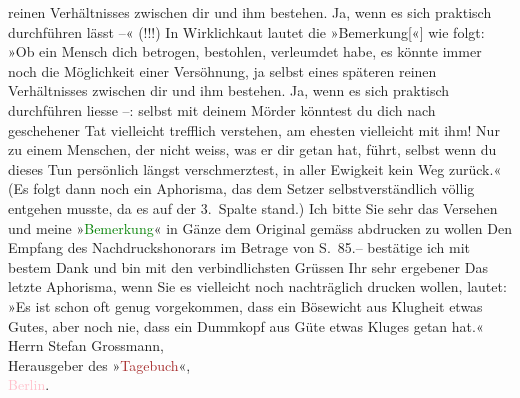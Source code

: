                     reinen Verhältnisses zwischen dir und ihm bestehen. Ja, wenn es sich praktisch
                    durchführen lässt –« (!!!)\pend
           \pstart
           In Wirklichkaut lautet die »Bemerkung{[}«{]} wie folgt:\pend
           \pstart
           »Ob ein Mensch dich betrogen, bestohlen, 
                    verleumdet habe, es könnte immer noch die Möglichkeit einer Versöhnung, ja
                    selbst eines späteren reinen Verhältnisses zwischen dir und ihm bestehen. Ja,
                    wenn es sich praktisch durchführen liesse –:
                    selbst mit deinem Mörder könntest du dich nach geschehener Tat vielleicht
                    trefflich verstehen, am ehesten vielleicht mit ihm! Nur {\pb}zu einem Menschen, der nicht weiss, was er dir
                    getan hat, führt, selbst wenn du dieses Tun persönlich längst verschmerztest, in
                    aller Ewigkeit kein Weg zurück.«\pend
           \pstart
           (Es folgt dann noch ein Aphorisma, das dem Setzer selbstverständlich völlig
                    entgehen musste, da es auf der 3. Spalte stand.)\pend
           \pstart
           Ich bitte Sie sehr das Versehen \label{K_L02476_1v}\label{K_L02476_1h} und meine
                        »\textcolor{green}{Bemerkung}{}\ledrightnote{\textcolor{green}{Bemerkungen. (Aus dem noch unveröffentlichten „Buch der Sprüche und Bedenken“.)}}« in Gänze dem Original gemäss
                    abdrucken zu wollen\pend
           \pstart
           Den Empfang des Nachdruckshonorars im Betrage von S. 85.– bestätige ich mit
                    bestem Dank und bin mit den verbindlichsten Grüssen\pend
           \pstart Ihr sehr ergebener\pend{}{\bigskip}\pstart
           \noindent{}Das letzte Aphorisma, wenn Sie es vielleicht noch nachträglich drucken
                        wollen, lautet:\pend
           \pstart
           »Es ist schon oft genug vorgekommen, dass ein Bösewicht aus Klugheit etwas
                        Gutes, aber noch nie, dass ein Dummkopf aus Güte etwas Kluges getan
                        hat.«\pend
           {\bigskip}\pstart
           \noindent{}Herrn Stefan Grossmann,{\\}Herausgeber des »\textcolor{brown}{Tagebuch}{}\ledrightnote{\textcolor{brown}{Das Tage-Buch}}«,{\\}\textcolor{pink}{Berlin}{}\ledrightnote{\textcolor{pink}{Berlin}}.\pend
           \endnumbering{}  
      